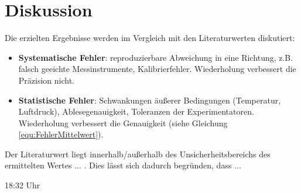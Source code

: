 \section{Diskussion}


Die erzielten Ergebnisse werden im Vergleich mit den Literaturwerten diskutiert:
\begin{itemize}
    \item \textbf{Systematische Fehler}: reproduzierbare Abweichung in eine Richtung, z.B. falsch geeichte Messinstrumente, Kalibrierfehler. Wiederholung verbessert die Präzision nicht.
    \item \textbf{Statistische Fehler}: Schwankungen äußerer Bedingungen (Temperatur, Luftdruck), Ablesegenauigkeit, Toleranzen der Experimentatoren. Wiederholung verbessert die Genauigkeit (siehe Gleichung \eqref{equ:FehlerMittelwert}).
\end{itemize}

\noindent Der Literaturwert \cite{Example2023} liegt innerhalb/außerhalb des Unsicherheitsbereichs des ermittelten Wertes ... . Dies lässt sich dadurch begründen, dass ...

18:32 Uhr
